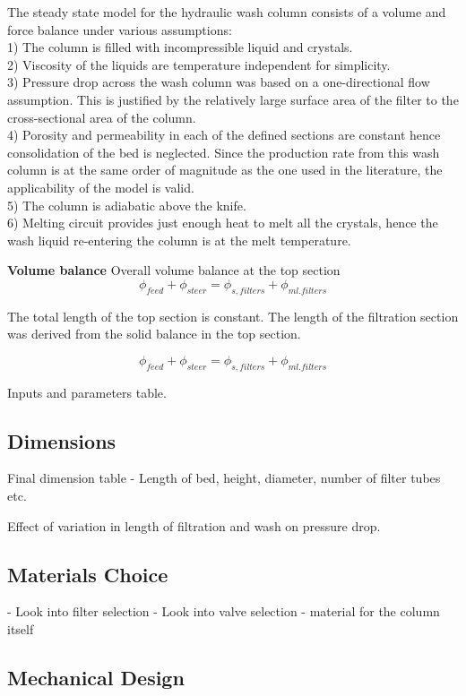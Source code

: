 The steady state model for the hydraulic wash column consists of a volume and force balance under various assumptions:
\\ 1) The column is filled with incompressible liquid and crystals. 
\\ 2) Viscosity of the liquids are temperature independent for simplicity. 
\\ 3) Pressure drop across the wash column was based on a one-directional flow assumption. This is justified by the relatively large surface area of the filter to the cross-sectional area of the column. 
\\ 4) Porosity and permeability in each of the defined sections are constant hence consolidation of the bed is neglected. Since the production rate from this wash column is at the same order of magnitude as the one used in the literature, the applicability of the model is valid. 
\\ 5) The column is adiabatic above the knife.
\\ 6) Melting circuit provides just enough heat to melt all the crystals, hence the wash liquid re-entering the column is at the melt temperature. 

\textbf{Volume balance} 
Overall volume balance at the top section 
\begin{equation}
\phi_{feed}+\phi_{steer}=\phi_{s,filters}+\phi_{ml.filters}
\end{equation}

The total length of the top section is constant. The length of the filtration section was derived from the solid balance in the top section. 

\begin{equation}
\phi_{feed}+\phi_{steer}=\phi_{s,filters}+\phi_{ml.filters}
\end{equation}








Inputs and parameters table. 

\subsection{Dimensions}
Final dimension table - Length of bed, height, diameter, number of filter tubes etc. 

Effect of variation in length of filtration and wash on pressure drop. 


\subsection{Materials Choice}
- Look into filter selection
- Look into valve selection 
- material for the column itself 

\subsection{Mechanical Design}


